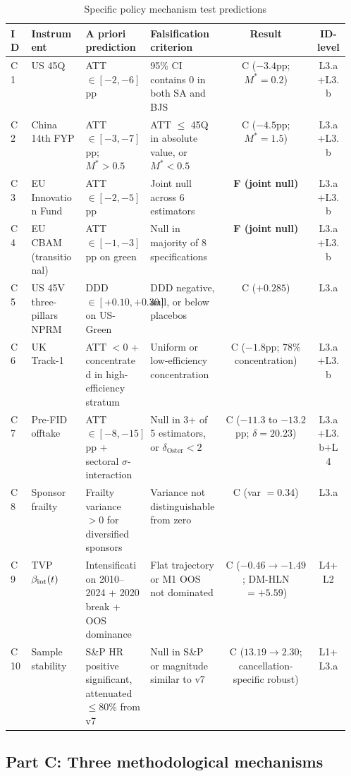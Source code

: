 \begin{table}[!htbp]
\centering
\caption{Specific policy mechanism test predictions}
\label{tab:app-mech-B}
\small
\begin{tabular}{lp{0.16\linewidth}p{0.18\linewidth}p{0.22\linewidth}cc}
\toprule
ID & Instrument & A priori prediction & Falsification criterion & Result & ID-level \\
\midrule
C1 & US 45Q & ATT $\in [-2, -6]$pp & 95\% CI contains 0 in both SA and BJS & C ($-3.4$pp; $M^*=0.2$) & L3.a+L3.b \\
C2 & China 14th FYP & ATT $\in [-3, -7]$pp; $M^* > 0.5$ & ATT $\leq$ 45Q in absolute value, or $M^* < 0.5$ & C ($-4.5$pp; $M^*=1.5$) & L3.a+L3.b \\
C3 & EU Innovation Fund & ATT $\in [-2, -5]$pp & Joint null across 6 estimators & \textbf{F (joint null)} & L3.a+L3.b \\
C4 & EU CBAM (transitional) & ATT $\in [-1, -3]$pp on green & Null in majority of 8 specifications & \textbf{F (joint null)} & L3.a+L3.b \\
C5 & US 45V three-pillars NPRM & DDD $\in [+0.10, +0.30]$ on US-Green & DDD negative, null, or below placebos & C ($+0.285$) & L3.a \\
C6 & UK Track-1 & ATT $<0$ + concentrated in high-efficiency stratum & Uniform or low-efficiency concentration & C ($-1.8$pp; 78\% concentration) & L3.a+L3.b \\
C7 & Pre-FID offtake & ATT $\in [-8, -15]$pp + sectoral $\sigma$-interaction & Null in 3+ of 5 estimators, or $\delta_{\text{Oster}} < 2$ & C ($-11.3$ to $-13.2$pp; $\delta = 20.23$) & L3.a+L3.b+L4 \\
C8 & Sponsor frailty & Frailty variance $> 0$ for diversified sponsors & Variance not distinguishable from zero & C (var $=0.34$) & L3.a \\
C9 & TVP $\beta_{\mathrm{int}}(t)$ & Intensification 2010--2024 + 2020 break + OOS dominance & Flat trajectory or M1 OOS not dominated & C ($-0.46 \to -1.49$; DM-HLN $=+5.59$) & L4+L2 \\
C10 & Sample stability & S\&P HR positive significant, attenuated $\leq 80\%$ from v7 & Null in S\&P or magnitude similar to v7 & C ($13.19 \to 2.30$; cancellation-specific robust) & L1+L3.a \\
\bottomrule
\end{tabular}
\end{table}

\subsection*{Part C: Three methodological mechanisms}

